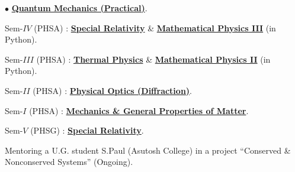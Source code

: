 \documentclass[margin,line]{res}
\newenvironment{list2}{
  \begin{list}{$\bullet$}{%
      \setlength{\itemsep}{0in}
      \setlength{\parsep}{0in} \setlength{\parskip}{0in}
      \setlength{\topsep}{0in} \setlength{\partopsep}{0in} 
      \setlength{\leftmargin}{0.2in}}}{\end{list}}
\begin{document}
\begin{resume}
\begin{list2}
                       \href{https://amitbny.github.io/akb.github.io/sem5H_numerlab.html}{\bf Quantum Mechanics (Practical)}.
\item Sem-$IV$ (PHSA) : \href{https://amitbny.github.io/akb.github.io/sem4H_SR.html}{\bf Special Relativity} \& 
                        \href{https://amitbny.github.io/akb.github.io/sem4H_numerlab.html}{\bf Mathematical Physics III} (in Python). 
\item Sem-$III$ (PHSA) : \href{https://amitbny.github.io/akb.github.io/sem3H_thermal.html}{\bf Thermal Physics} \& 
                         \href{https://amitbny.github.io/akb.github.io/sem3H_numerlab.html}{\bf Mathematical Physics II} (in Python). 
\item Sem-$II$ (PHSA) : \href{https://amitbny.github.io/akb.github.io/sem2H_diffholo.html}{\bf Physical Optics (Diffraction)}.
\item Sem-$I$ (PHSA) : \href{https://amitbny.github.io/akb.github.io/sem1H_fluidniner.html}{\bf Mechanics \& General Properties of Matter}. 
\item Sem-$V$ (PHSG) : \href{https://amitbny.github.io/akb.github.io/sem5G_SR.html}{\bf Special Relativity}.
\item Mentoring a U.G. student S.Paul (Asutosh College) in a project ``{\sf Conserved \& Nonconserved Systems}'' (Ongoing). 
\end{list2}


\end{resume}
\end{document}
